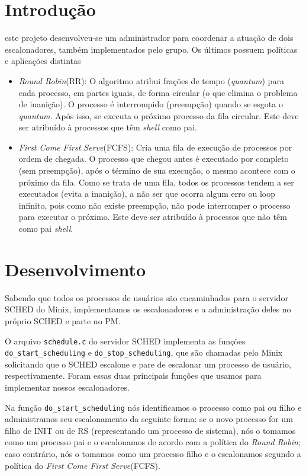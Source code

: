 \documentclass[12pt,journal,compsoc]{IEEEtran}
\begin{document}
\section{Introdução}
este projeto desenvolveu-se um administrador para coordenar a atuação de dois escalonadores, também implementados pelo grupo. Os últimos possuem políticas e aplicações distintas
\begin{itemize}
	\item \textit{Round Robin}(RR): O algoritmo atribui frações de tempo (\textit{quantum}) para cada processo, em partes iguais, de forma circular (o que elimina o problema de inanição). O processo é interrompido (preempção) quando se esgota o \textit{quantum}\cite{DefRoundRobin:Wiki}. Após isso, se executa o próximo processo da fila circular. Este deve ser atribuído à processos que têm \textit{shell} como pai.
    \item \textit{First Come First Serve}(FCFS): Cria uma fila de execução de processos por ordem de chegada. O processo que chegou antes é executado por completo (sem preempção), após o término de sua execução, o mesmo acontece com o próximo da fila. Como se trata de uma fila, todos os processos tendem a ser executados (evita a inanição), a não ser que ocorra algum erro ou loop infinito, pois como não existe preempção, não pode interromper o processo para executar o próximo\cite{DefFCFS:Wiki}. Este deve ser atribuído à processos que não têm como pai \textit{shell}.
\end{itemize}

\section{Desenvolvimento}
	Sabendo que todos os processos de usuários são encaminhados para o servidor SCHED do Minix, implementamos os escalonadores e a administração deles no próprio SCHED e parte no PM.
    
    O arquivo \texttt{schedule.c} do servidor SCHED implementa as funções \texttt{do\_start\_scheduling} e \texttt{do\_stop\_scheduling}, que são chamadas pelo Minix solicitando que o SCHED escalone e pare de escalonar um processo de usuário, respectivamente. Foram essas duas principais funções que usamos para implementar nossos escalonadores.

	Na função \texttt{do\_start\_scheduling} nós identificamos o processo como pai ou filho e administramos seu escalonamento da seguinte forma: se o novo processo for um filho de INIT ou de RS (representando um processo de sistema), nós o tomamos como um processo pai e o escalonamos de acordo com a política do \textit{Round Robin}; caso contrário, nós o tomamos como um processo filho e o escalonamos segundo a política do \textit{First Come First Serve}(FCFS).
\end{document}
